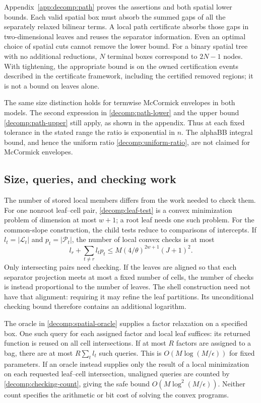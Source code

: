 Appendix~\ref{app:decomp:path} proves the assertions and both spatial lower
bounds. Each valid spatial box must absorb the summed gaps of all the
separately relaxed bilinear terms. A local path certificate absorbs those
gaps in two-dimensional leaves and reuses the separator information.
Even an optimal choice of spatial cuts cannot remove the lower bound.
For a binary spatial tree with no additional reductions, $N$ terminal
boxes correspond to $2N-1$ nodes. With tightening, the appropriate bound
is on the owned certification events described in the certificate
framework, including the certified removed regions; it is not a bound on
leaves alone.

The same size distinction holds for termwise McCormick envelopes in both
models. The second expression in \eqref{decomp:path-lower} and the upper
bound \eqref{decomp:path-upper} still apply, as shown in the appendix.
Thus at each fixed tolerance in the stated range the ratio is exponential
in $n$.
The alphaBB integral bound, and hence the uniform ratio
\eqref{decomp:uniform-ratio}, are not claimed for McCormick envelopes.

\subsection{Size, queries, and checking work}

The number of stored local members differs from the work needed to check
them. For one nonroot leaf--cell pair, \eqref{decomp:leaf-test} is a convex
minimization problem of dimension at most $w+1$; a root leaf needs one such
problem. For the common-slope construction, the child tests reduce to
comparisons of intercepts. If $l_t=|\mathcal L_t|$ and
$p_t=|\mathcal P_t|$, the number of local convex checks is at most
\begin{equation}\label{decomp:checking-count}
 l_r+\sum_{t\ne r}l_tp_t
 \le M(4/\theta)^{2w+1}(J+1)^2.
\end{equation}
Only intersecting pairs need checking. If the leaves are aligned so that
each separator projection meets at most a fixed number of cells, the
number of checks is instead proportional to the number of leaves. The
shell construction need not have that alignment: requiring it may refine
the leaf partitions. Its unconditional checking bound therefore contains
an additional logarithm.

The oracle in \eqref{decomp:spatial-oracle} supplies a factor relaxation
on a specified box. One such query for each assigned factor and local
leaf suffices: its returned function is reused on all cell intersections.
If at most $R$ factors are assigned to a bag, there are at most
$R\sum_tl_t$ such queries. This is $O(M\log(M/\epsilon))$ for fixed
parameters. If an oracle instead supplies only the result of a local
minimization on each requested leaf--cell intersection, unaligned queries
are counted by \eqref{decomp:checking-count}, giving the safe bound
$O(M\log^2(M/\epsilon))$. Neither count specifies the arithmetic or bit
cost of solving the convex programs.

